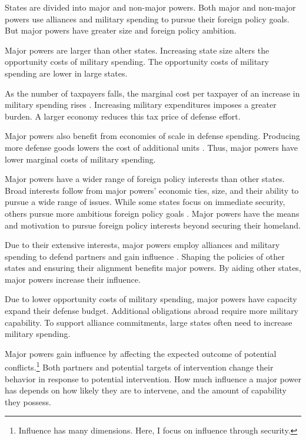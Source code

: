 \documentclass[12pt]{article}
\begin{document}
States are divided into major and non-major powers. 
Both major and non-major powers use alliances and military spending to pursue their foreign policy goals. 
But major powers have greater size and foreign policy ambition. 


Major powers are larger than other states. 
Increasing state size alters the opportunity costs of military spending.  
The opportunity costs of military spending are lower in large states.  


As the number of taxpayers falls, the marginal cost per taxpayer of an increase in military spending rises \citep{DudleyMontmarquette1981}. 
Increasing military expenditures imposes a greater burden.
A larger economy reduces this tax price of defense effort. 


Major powers also benefit from economies of scale in defense spending. 
Producing more defense goods lowers the cost of additional units \citep{Moravcsik1991, AlesinaSpolaore2006}. 
Thus, major powers have lower marginal costs of military spending. 


Major powers have a wider range of foreign policy interests than other states.
Broad interests follow from major powers' economic ties, size, and their ability to pursue a wide range of issues. 
While some states focus on immediate security, others pursue more ambitious foreign policy goals \citep{Fordham2011, MarkowitzFariss2017}. 
Major powers have the means and motivation to pursue foreign policy interests beyond securing their homeland. 


Due to their extensive interests, major powers employ alliances and military spending to defend partners and gain influence \citep{Morrow1991}. 
Shaping the policies of other states and ensuring their alignment benefits major powers. 
By aiding other states, major powers increase their influence. 


Due to lower opportunity costs of military spending, major powers have capacity expand their defense budget. 
Additional obligations abroad require more military capability. 
To support alliance commitments, large states often need to increase military spending.


Major powers gain influence by affecting the expected outcome of potential conflicts.\footnote{Influence has many dimensions. Here, I focus on influence through security.} 
Both partners and potential targets of intervention change their behavior in response to potential intervention. 
How much influence a major power has depends on how likely they are to intervene, and the amount of capability they possess. 
\end{document}
